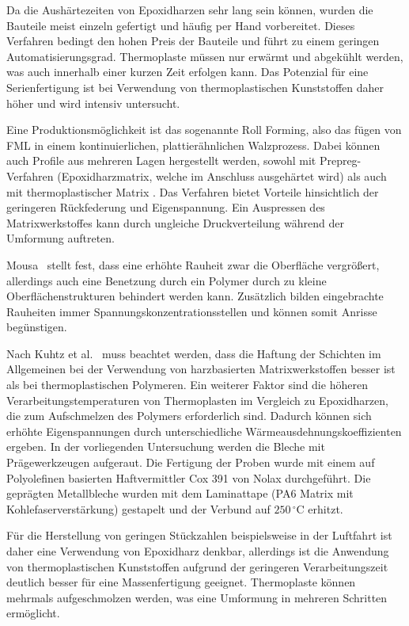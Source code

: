 Da die Aushärtezeiten von Epoxidharzen sehr lang sein können, wurden die Bauteile meist einzeln gefertigt und häufig per Hand vorbereitet.
Dieses Verfahren bedingt den hohen Preis der Bauteile und führt zu einem geringen Automatisierungsgrad.
Thermoplaste müssen nur erwärmt und abgekühlt werden, was auch innerhalb einer kurzen Zeit erfolgen kann.
Das Potenzial für eine Serienfertigung ist bei Verwendung von thermoplastischen Kunststoffen daher höher und wird intensiv untersucht.

Eine Produktionsmöglichkeit ist das sogenannte Roll Forming, also das fügen von FML in einem kontinuierlichen, plattierähnlichen Walzprozess.
Dabei können auch Profile aus mehreren Lagen hergestellt werden, sowohl mit Prepreg-Verfahren (Epoxidharzmatrix, welche im Anschluss ausgehärtet wird) als auch mit thermoplastischer Matrix \cite{Long.2007}.
Das Verfahren bietet Vorteile hinsichtlich der geringeren Rückfederung und Eigenspannung.
Ein Auspressen des Matrixwerkstoffes kann durch ungleiche Druckverteilung während der Umformung auftreten.~\cite{Long.2007}

Mousa~\cite{Mousa.2015} stellt fest, dass eine erhöhte Rauheit zwar die Oberfläche vergrößert, allerdings auch eine Benetzung durch ein Polymer durch zu kleine Oberflächenstrukturen behindert werden kann.
Zusätzlich bilden eingebrachte Rauheiten immer Spannungskonzentrationsstellen und können somit Anrisse begünstigen.

Nach Kuhtz et al.~\cite{Kuhtz.2019} muss beachtet werden, dass die Haftung der Schichten im Allgemeinen bei der Verwendung von harzbasierten Matrixwerkstoffen besser ist als bei thermoplastischen Polymeren.
Ein weiterer Faktor sind die höheren Verarbeitungstemperaturen von Thermoplasten im Vergleich zu Epoxidharzen, die zum Aufschmelzen des Polymers erforderlich sind.
Dadurch können sich erhöhte Eigenspannungen durch unterschiedliche Wärmeausdehnungskoeffizienten ergeben.
In der vorliegenden Untersuchung werden die Bleche mit Prägewerkzeugen aufgeraut.
Die Fertigung der Proben wurde mit einem auf Polyolefinen basierten Haftvermittler Cox 391 von Nolax durchgeführt.
Die geprägten Metallbleche wurden mit dem Laminattape (PA6 Matrix mit Kohlefaserverstärkung) gestapelt und der Verbund auf $250 \, ^\circ \text{C}$ erhitzt.

Für die Herstellung von geringen Stückzahlen beispielsweise in der Luftfahrt ist daher eine Verwendung von Epoxidharz denkbar, allerdings ist die Anwendung von thermoplastischen Kunststoffen aufgrund der geringeren Verarbeitungszeit deutlich besser für eine Massenfertigung geeignet.
Thermoplaste können mehrmals aufgeschmolzen werden, was eine Umformung in mehreren Schritten ermöglicht.~\cite{ReyesV..2000, Wollmann.2018}


